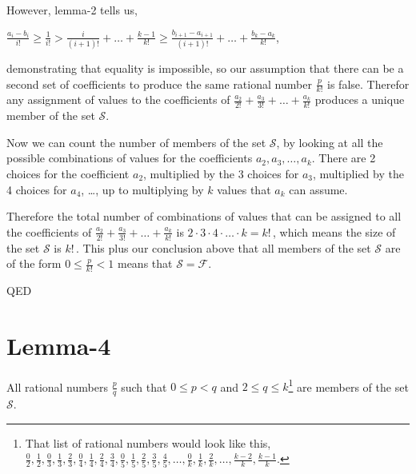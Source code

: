 \documentclass{article}
\begin{document}
However, lemma-2 tells us,\par
\begin{center}
\(\frac{a_i - b_i}{i!} \ge{} \frac{1}{i!} > \frac{i}{(i+1)!} + \dots{} + \frac{k-1}{k!} \ge{} \frac{b_{i+1} - a_{i+1}}{(i+1)!} + \dots{} + \frac{b_k - a_k}{k!}\),
\end{center}\par
demonstrating that equality is impossible, so our assumption that there can be a second set
of coefficients to produce the same rational number \(\frac{p}{k!}\) is false.
Therefor any assignment of values to the coefficients of
\(\frac{a_2}{2!} + \frac{a_3}{3!} + \dots{} + \frac{a_k}{k!}\)
produces a unique member of the set \(\mathcal{S}\).

Now we can count the number of members of the set \(\mathcal{S}\), by looking at all the
possible combinations of values for the coefficients \(a_2, a_3, \dots{}, a_k\).
There are 2 choices for the coefficient \(a_2\),
multiplied by the 3 choices for \(a_3\),
multiplied by the 4 choices for \(a_4\),
\dots{},
up to multiplying by \(k\) values that \(a_k\) can assume.

Therefore the total number of combinations of values
that can be assigned to all the coefficients of \(\frac{a_2}{2!} + \frac{a_3}{3!} + \dots{} + \frac{a_k}{k!}\)
is \(2\cdot{}3\cdot{}4\cdot\dots{}\cdot{}k = k!\,\),
which means the size of the set \(\mathcal{S}\) is \(k!\, \). This plus our conclusion above that
all members of the set \(\mathcal{S}\) are of the form \(0\le{}\frac{p}{k!}<1\)
means that
\(\mathcal{S} = \mathcal{F}\).

\begin{center}
QED
\end{center}

\section*{Lemma-4}

All rational numbers \(\frac{p}{q}\) such that \(0\le{}p<q\) and \(2\le{}q\le{k}\)\footnote{That list
of rational numbers 
would look like this,
\(
\frac{0}{2},
\frac{1}{2},
\frac{0}{3},
\frac{1}{3},
\frac{2}{3},
\frac{0}{4},
\frac{1}{4},
\frac{2}{4},
\frac{3}{4},
\frac{0}{5},
\frac{1}{5},
\frac{2}{5},
\frac{3}{5},
\frac{4}{5},
\dots{},
\frac{0}{k},
\frac{1}{k},
\frac{2}{k},
\dots{},
\frac{k-2}{k},
\frac{k-1}{k}\).} are members of the set \(\mathcal{S}\).
\end{document}
